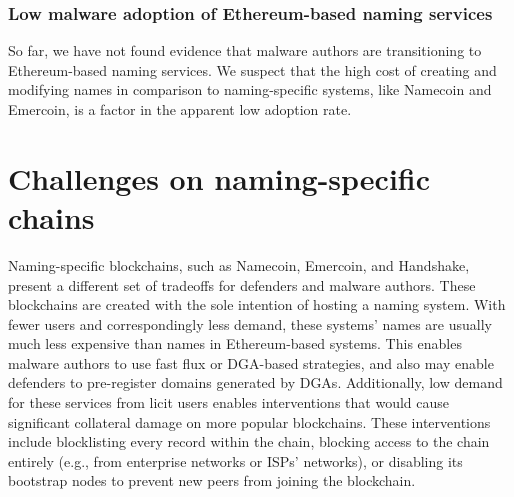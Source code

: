 \documentclass[10pt,sigconf,letterpaper]{acmart}
\begin{document}
\subsubsection{Low malware adoption of Ethereum-based naming services}

So far, we have not found evidence that malware authors are 
transitioning to Ethereum-based naming services. We suspect that the high 
cost of creating and modifying names in comparison to naming-specific systems, 
like Namecoin and Emercoin, is a 
factor in the apparent low adoption rate. 


\section{Challenges on naming-specific chains}

Naming-specific blockchains, such as Namecoin, Emercoin, and Handshake, 
present 
a different set of tradeoffs for defenders and malware authors. These 
blockchains are created with the sole intention of hosting a naming system. 
With fewer users and correspondingly less demand, these systems' names are 
usually much less expensive than names in Ethereum-based systems. This enables 
malware 
authors to use fast flux or DGA-based strategies, and also may enable 
defenders 
to pre-register domains generated by DGAs. Additionally, low demand for 
these 
services from licit users enables interventions that would cause significant 
collateral damage on more popular blockchains. These interventions include 
blocklisting every record within the chain, blocking access to the chain 
entirely (e.g., from enterprise networks or ISPs' networks), or disabling 
its 
bootstrap nodes to prevent new peers from joining the blockchain.
\end{document}
